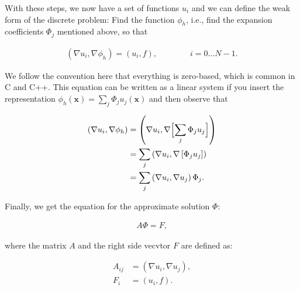 \documentclass[]{pracamgr}
\begin{document}
      With these steps, we now have a set of functions $u_i$ and we can define the weak form of the discrete problem: Find the function $\phi_h$, i.e., find the expansion coefficients $\Phi_j$ mentioned above, so that

      \begin{align*}
        (\nabla u_i, \nabla \phi_h)
         = (u_i, f),
         \qquad\qquad
         i=0\ldots N-1.
      \end{align*}

      We follow the convention here that everything is zero-based, which is common in C and C++. This equation can be written as a linear system if you insert the representation $\phi_h(\mathbf x)=\sum_j \Phi_j u_j(\mathbf x)$ and then observe that

      \begin{align*}
        (\nabla u_i, \nabla \phi_h)
        &= \left(\nabla u_i, \nabla \Bigl[\sum_j \Phi_j u_j\Bigr]\right)
        \\
        &= \sum_j \left(\nabla u_i, \nabla \left[\Phi_j u_j\right]\right)
        \\
        &= \sum_j \left(\nabla u_i, \nabla u_j \right) \Phi_j.
      \end{align*}

      Finally, we get the equation for the approximate solution $\Phi$:
      
      \begin{align*}
        A \Phi = F,
      \end{align*}
      
      where the matrix $A$ and the right side vecvtor $F$ are defined as:

      \begin{align*}
        A_{ij} &= (\nabla u_i, \nabla u_j),
        \\
        F_i &= (u_i, f).
      \end{align*}
\end{document}
